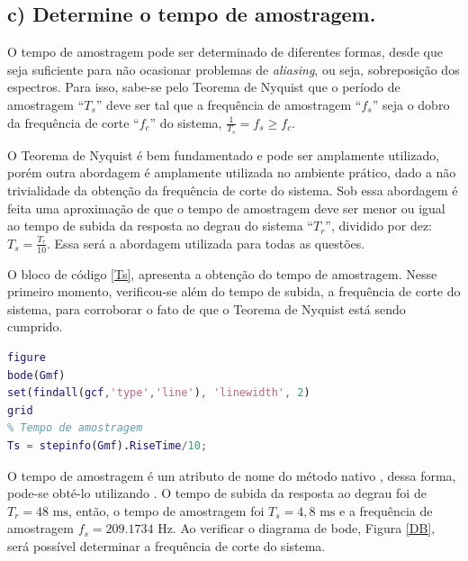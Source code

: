     
    \subsection*{c) Determine o tempo de amostragem.}
        O tempo de amostragem pode ser determinado de diferentes formas, desde que seja suficiente para não ocasionar problemas de \textit{aliasing}, ou seja, 
        sobreposição dos espectros. Para isso, sabe-se pelo Teorema de Nyquist que o período de amostragem ``$T_s$'' deve ser tal que a frequência de amostragem ``$f_s$''
        seja o dobro da frequência de corte ``$f_c$'' do sistema, $\frac{1}{T_s} = f_s \ge f_c$.

        O Teorema de Nyquist é bem fundamentado e pode ser amplamente utilizado, porém outra abordagem é amplamente utilizada no ambiente prático, dado a não trivialidade
        da obtenção da frequência de corte do sistema. Sob essa abordagem é feita uma aproximação de que o tempo de amostragem deve ser menor ou igual ao tempo de subida 
        da resposta ao degrau do sistema ``$T_r$'', dividido por dez: $T_s = \frac{T_r}{10}$. Essa será a abordagem utilizada para todas as questões.
        
        O bloco de código \ref{Ts}, apresenta a obtenção do tempo de amostragem. Nesse primeiro momento, verificou-se além do tempo de subida, a frequência de corte do 
        sistema, para corroborar o fato de que o Teorema de Nyquist está sendo cumprido. 

        \begin{lstlisting}[language=Matlab,label=Ts,caption=Tempo de amostragem]
%% Q c)
figure
bode(Gmf)
set(findall(gcf,'type','line'), 'linewidth', 2)
grid
% Tempo de amostragem
Ts = stepinfo(Gmf).RiseTime/10;
        \end{lstlisting}

        O tempo de amostragem é um atributo de nome  do método nativo , dessa forma, pode-se obté-lo utilizando 
        . 
        O tempo de subida da resposta ao degrau foi de $T_r = 48 \text{ ms}$, então, o tempo de amostragem foi $T_s = 4,8 \text{ ms}$ e a frequência de amostragem
        $f_s = 209.1734 \text{ Hz}$. Ao verificar o diagrama de bode, Figura \ref{DB}, será possível determinar a frequência de corte do sistema. 
    
